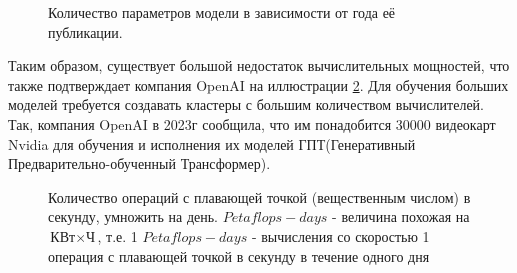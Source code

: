 \begin{figure}[h!]
	\caption{Количество параметров модели в зависимости от года её публикации.}
	\label{ris:ParametersANN}
\end{figure}
Таким образом, существует большой недостаток вычислительных мощностей, что также подтверждает компания OpenAI на иллюстрации \ref{ris:OpenAI}. Для обучения больших моделей требуется создавать кластеры с большим количеством вычислителей. Так, компания OpenAI в 2023г сообщила, что им понадобится 30000 видеокарт Nvidia для обучения и исполнения их моделей ГПТ(Генеративный Предварительно-обученный Трансформер).
\begin{figure}[h!]
	\caption{
		Количество операций с плавающей точкой (вещественным числом) в секунду, умножить на день.
		{\small *$Petaflops-days$ - величина похожая на $\text{КВт}\times\text{Ч}$, т.е. 1 $Petaflops-days$ - вычисления со скоростью 1 операция с плавающей точкой в секунду в течение одного дня}
		}
	\label{ris:OpenAI}
\end{figure}
\par
